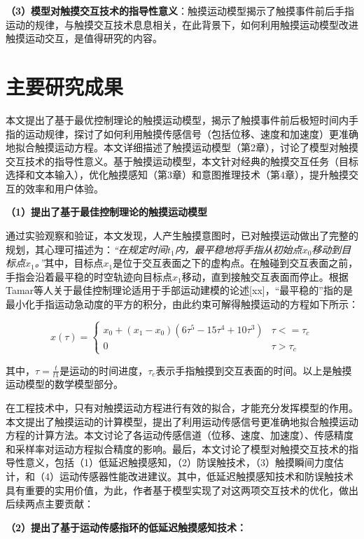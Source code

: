 \textbf{（3）模型对触摸交互技术的指导性意义}：触摸运动模型揭示了触摸事件前后手指运动的规律，与触摸交互技术息息相关，在此背景下，如何利用触摸运动模型改进触摸运动交互，是值得研究的内容。

\section{主要研究成果}

本文提出了基于最优控制理论的触摸运动模型，揭示了触摸事件前后极短时间内手指的运动规律，探讨了如何利用触摸传感信号（包括位移、速度和加速度）更准确地拟合触摸运动方程。本文详细描述了触摸运动模型（第2章），讨论了模型对触摸交互技术的指导性意义。基于触摸运动模型，本文针对经典的触摸交互任务（目标选择和文本输入），优化触摸感知（第3章）和意图推理技术（第4章），提升触摸交互的效率和用户体验。

\textbf{（1）提出了基于最佳控制理论的触摸运动模型}

通过实验观察和验证，本文发现，人产生触摸意图时，已对触摸运动做出了完整的规划，其心理可描述为：\emph{“在规定时间$t_1$内，最平稳地将手指从初始点$x_0$移动到目标点$x_1$。”}其中，目标点$x_1$是位于交互表面之下的虚构点。在触碰到交互表面之前，手指会沿着最平稳的时空轨迹向目标点$x_1$移动，直到接触交互表面而停止。根据Tamar等人关于最佳控制理论适用于手部运动建模的论述[xx]，“最平稳的”指的是最小化手指运动急动度的平方的积分，由此约束可解得触摸运动的方程如下所示：

\begin{equation}
x(\tau)=
\begin{cases}
x_0+(x_1-x_0)(6\tau^5-15\tau^4+10\tau^3)& \tau<=\tau_c \\
0& \tau>\tau_c
\end{cases}
\end{equation}

其中，$\tau=\frac{t}{t1}$是运动的时间进度，$\tau_c$表示手指触摸到交互表面的时间。以上是触摸运动模型的数学模型部分。

在工程技术中，只有对触摸运动方程进行有效的拟合，才能充分发挥模型的作用。本文提出了触摸运动的计算模型，提出了利用运动传感信号更准确地拟合触摸运动方程的计算方法。本文讨论了各运动传感信道（位移、速度、加速度）、传感精度和采样率对运动方程拟合精度的影响。最后，本文讨论了模型对触摸交互技术的指导性意义，包括（1）低延迟触摸感知，（2）防误触技术，（3）触摸瞬间力度估计，和（4）运动传感器性能改进建议。其中，低延迟触摸感知技术和防误触技术具有重要的实用价值，为此，作者基于模型实现了对这两项交互技术的优化，做出后续两点主要贡献：

\textbf{（2）提出了基于运动传感指环的低延迟触摸感知技术：}


